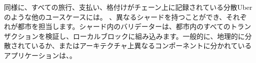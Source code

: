 同様に、すべての旅行、支払い、格付けがチェーン上に記録されている分散Uberのような他のユースケースには。
、異なるシャードを持つことができ、それぞれが都市を担当します。シャード内のバリデーターは、都市内のすべてのトランザクションを検証し、ローカルブロックに組み込みます。一般的に、地理的に分散されているか、またはアーキテクチャ上異なるコンポーネントに分かれているアプリケーションは、。

